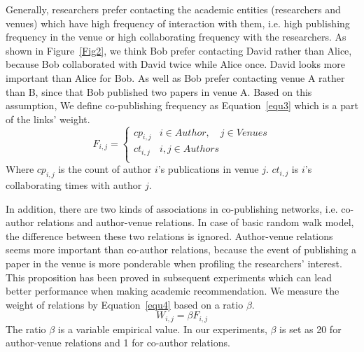 \documentclass[9pt]{acm_proc_article-sp}
\begin{document}
Generally, researchers prefer contacting the academic entities (researchers and venues) which have high frequency of interaction with them, i.e. high publishing frequency in the venue or high collaborating frequency with the researchers. As shown in Figure~\ref{Fig2}, we think Bob prefer contacting David rather than Alice, because Bob collaborated with David twice while Alice once. David looks more important than Alice for Bob. As well as Bob prefer contacting venue A rather than B, since that Bob published two papers in venue A. Based on this assumption, We define co-publishing frequency as Equation~\ref{equ3} which is a part of the links' weight.
\begin{equation}
\label{equ3}
F_{i,j}=\left\{\begin{array}{ll}
cp_{i,j} & i\in Author,\quad j\in Venues\\
ct_{i,j} & i,j\in Authors\\
\end{array}\right.
\end{equation}
Where $cp_{i,j}$ is the count of author $i$'s publications in venue $j$. $ct_{i,j}$ is $i$'s collaborating times with author $j$.

In addition, there are two kinds of associations in co-publishing networks, i.e. co-author relations and author-venue relations. In case of basic random walk model, the difference between these two relations is ignored. Author-venue relations seems more important than co-author relations, because the event of publishing a paper in the venue is more ponderable when profiling the researchers' interest. This proposition has been proved in subsequent experiments which can lead better performance when making academic recommendation. We measure the weight of relations by Equation~\ref{equ4} based on a ratio $\beta$.
\begin{equation}
\label{equ4}
W_{i,j}=\beta F_{i,j}
\end{equation}
The ratio $\beta$ is a variable empirical value. In our experiments, $\beta$ is set as 20 for author-venue relations and 1 for co-author relations.
\end{document}
